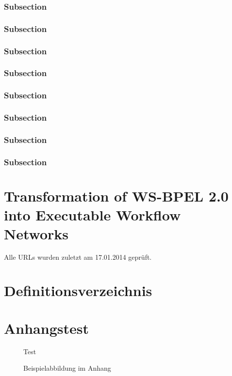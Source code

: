 \documentclass[paper=a5,twoside,fontsize=10pt, DIV=calc, headings=small, bibliography=totoc, listof=totoc]{scrbook}
\begin{document}
\subsection{Subsection}
\subsection{Subsection}
\subsection{Subsection}
\subsection{Subsection}
\subsection{Subsection}
\subsection{Subsection}
\subsection{Subsection}
\subsection{Subsection}

%
\chapter{Transformation of WS-BPEL 2.0 into Executable Workflow Networks}
\label{chap:bpel-ewfn-transformation}

\blindtext[3]

\resetchapterfooter

\printbibliography
\noindent
Alle URLs wurden zuletzt am 17.01.2014 gepr\"uft.

\clearpage
\listoffigures
\listoftables

\chapter*{Definitionsverzeichnis}

\appendix


\chapter{Anhangstest}

\begin{figure}
Test
\caption{Beispielabbildung im Anhang}
\end{figure}

%

\end{document}
